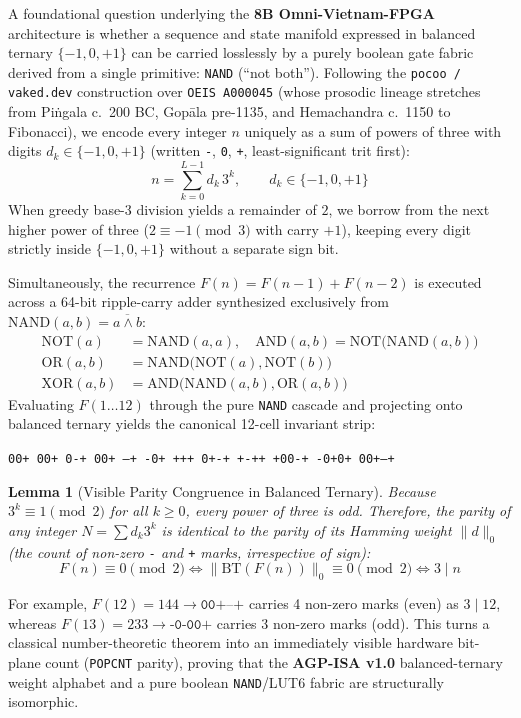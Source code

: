 \documentclass[10pt, twocolumn, a4paper]{article}
\newtheorem{lemma}{Lemma}
\begin{document}
A foundational question underlying the \textbf{8B Omni-Vietnam-FPGA} architecture is whether a sequence and state manifold expressed in balanced ternary $\{-1, 0, +1\}$ can be carried losslessly by a purely boolean gate fabric derived from a single primitive: \texttt{NAND} (``not both''). Following the \texttt{pocoo / vaked.dev} construction over \texttt{OEIS A000045} (whose prosodic lineage stretches from Pi\.ngala c.\ 200 BC, Gop\=ala pre-1135, and Hemachandra c.\ 1150 to Fibonacci), we encode every integer $n$ uniquely as a sum of powers of three with digits $d_k \in \{-1, 0, +1\}$ (written \texttt{-}, \texttt{0}, \texttt{+}, least-significant trit first):
\begin{equation}
n = \sum_{k=0}^{L-1} d_k \, 3^k, \qquad d_k \in \{-1, 0, +1\}
\end{equation}
When greedy base-3 division yields a remainder of $2$, we borrow from the next higher power of three ($2 \equiv -1 \pmod 3$ with carry $+1$), keeping every digit strictly inside $\{-1, 0, +1\}$ without a separate sign bit.

Simultaneously, the recurrence $F(n) = F(n-1) + F(n-2)$ is executed across a 64-bit ripple-carry adder synthesized exclusively from $\text{NAND}(a, b) = \overline{a \land b}$:
\begin{align}
\text{NOT}(a) &= \text{NAND}(a, a), \quad \text{AND}(a, b) = \text{NOT}\big(\text{NAND}(a, b)\big) \\
\text{OR}(a, b) &= \text{NAND}\big(\text{NOT}(a), \text{NOT}(b)\big) \\
\text{XOR}(a, b) &= \text{AND}\big(\text{NAND}(a, b), \text{OR}(a, b)\big)
\end{align}
Evaluating $F(1 \dots 12)$ through the pure \texttt{NAND} cascade and projecting onto balanced ternary yields the canonical 12-cell invariant strip:
\begin{center}
\texttt{00+ 00+ 0-+ 00+ --+ -0+ +++ 0+-+ +-++ +00-+ -0+0+ 00+--+}
\end{center}

\begin{lemma}[Visible Parity Congruence in Balanced Ternary]
Because $3^k \equiv 1 \pmod 2$ for all $k \ge 0$, every power of three is odd. Therefore, the parity of any integer $N = \sum d_k 3^k$ is identical to the parity of its Hamming weight $\|d\|_0$ (the count of non-zero \texttt{-} and \texttt{+} marks, irrespective of sign):
\begin{equation}
F(n) \equiv 0 \pmod 2 \iff \| \text{BT}(F(n)) \|_0 \equiv 0 \pmod 2 \iff 3 \mid n
\end{equation}
\end{lemma}
For example, $F(12) = 144 \to \texttt{00+--+}$ carries 4 non-zero marks (even) as $3 \mid 12$, whereas $F(13) = 233 \to \texttt{-0-00+}$ carries 3 non-zero marks (odd). This turns a classical number-theoretic theorem into an immediately visible hardware bit-plane count (\texttt{POPCNT} parity), proving that the \textbf{AGP-ISA v1.0} balanced-ternary weight alphabet and a pure boolean \texttt{NAND}/LUT6 fabric are structurally isomorphic.
\end{document}
